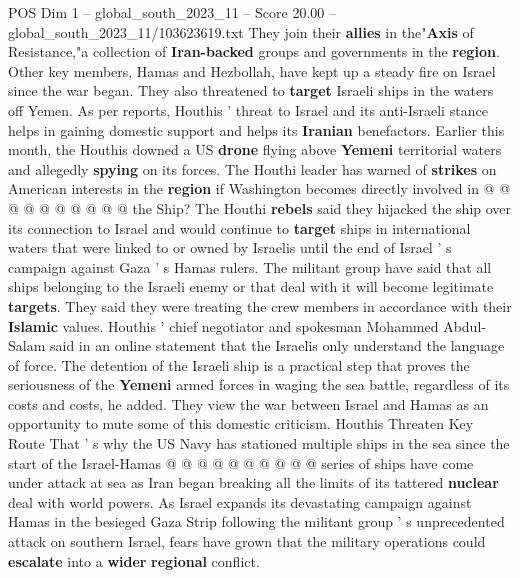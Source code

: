 \begin{textsample}{POS Dim 1 – global\_south\_2023\_11 – Score 20.00 – global\_south\_2023\_11/103623619.txt}
They join their \textbf{allies} in the"\textbf{Axis} of Resistance,"a collection of \textbf{Iran-backed} groups and governments in the \textbf{region}.
Other key members, Hamas and Hezbollah, have kept up a steady fire on Israel since the war began.
They also threatened to \textbf{target} Israeli ships in the waters off Yemen.
As per reports, Houthis ' threat to Israel and its anti-Israeli stance helps in gaining domestic support and helps its \textbf{Iranian} benefactors.
Earlier this month, the Houthis downed a US \textbf{drone} flying above \textbf{Yemeni} territorial waters and allegedly \textbf{spying} on its forces.
The Houthi leader has warned of \textbf{strikes} on American interests in the \textbf{region} if Washington becomes directly involved in @ @ @ @ @ @ @ @ @ @ the Ship?
The Houthi \textbf{rebels} said they hijacked the ship over its connection to Israel and would continue to \textbf{target} ships in international waters that were linked to or owned by Israelis until the end of Israel ' s campaign against Gaza ' s Hamas rulers.
The militant group have said that all ships belonging to the Israeli enemy or that deal with it will become legitimate \textbf{targets}.
They said they were treating the crew members in accordance with their \textbf{Islamic} values.
Houthis ' chief negotiator and spokesman Mohammed Abdul-Salam said in an online statement that the Israelis only understand the language of force.
The detention of the Israeli ship is a practical step that proves the seriousness of the \textbf{Yemeni} armed forces in waging the sea battle, regardless of its costs and costs, he added.
They view the war between Israel and Hamas as an opportunity to mute some of this domestic criticism.
Houthis Threaten Key Route That ' s why the US Navy has stationed multiple ships in the sea since the start of the Israel-Hamas @ @ @ @ @ @ @ @ @ @ series of ships have come under attack at sea as Iran began breaking all the limits of its tattered \textbf{nuclear} deal with world powers.
As Israel expands its devastating campaign against Hamas in the besieged Gaza Strip following the militant group ' s unprecedented attack on southern Israel, fears have grown that the military operations could \textbf{escalate} into a \textbf{wider} \textbf{regional} conflict.

\end{textsample}
